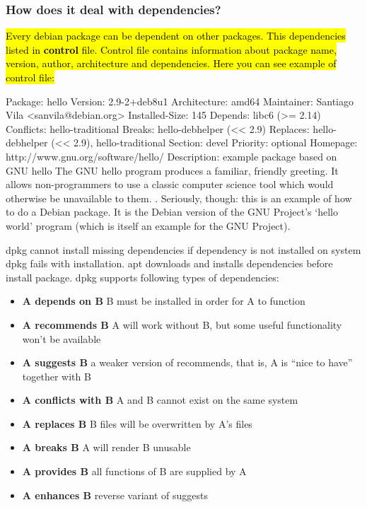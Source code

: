 \documentclass[a4paper,11pt]{article}
\begin{document}
\subsubsection{How does it deal with dependencies?}
\hl{Every debian package can be dependent on other packages. This dependencies listed in \textbf{control} file. Control file contains information about package name, version, author, architecture and dependencies. Here you can see example of control file:}

\begin{bashcode}
Package: hello
Version: 2.9-2+deb8u1
Architecture: amd64
Maintainer: Santiago Vila <sanvila@debian.org>
Installed-Size: 145
Depends: libc6 (>= 2.14)
Conflicts: hello-traditional
Breaks: hello-debhelper (<< 2.9)
Replaces: hello-debhelper (<< 2.9), hello-traditional
Section: devel
Priority: optional
Homepage: http://www.gnu.org/software/hello/
Description: example package based on GNU hello
  The GNU hello program produces a familiar, friendly greeting.  It
  allows non-programmers to use a classic computer science tool which
  would otherwise be unavailable to them.
  .
  Seriously, though: this is an example of how to do a Debian package.
  It is the Debian version of the GNU Project's `hello world' program
  (which is itself an example for the GNU Project).
\end{bashcode}

dpkg cannot install missing dependencies if dependency is not installed on system dpkg fails with installation. apt downloads and installs dependencies before install package. dpkg supports following types of dependencies:

\begin{itemize}
  \item \textbf{A depends on B} B must be installed in order for A to function
  \item \textbf{A recommends B} A will work without B, but some useful functionality won’t be available
\item \textbf{A suggests B} a weaker version of recommends, that is, A is “nice to have” together with B
\item \textbf{A conflicts with B} A and B cannot exist on the same system
\item \textbf{A replaces B} B files will be overwritten by A’s files
\item \textbf{A breaks B} A will render B unusable
\item \textbf{A provides B} all functions of B are supplied by A
\item \textbf{A enhances B} reverse variant of suggests
\end{itemize}
\end{document}
